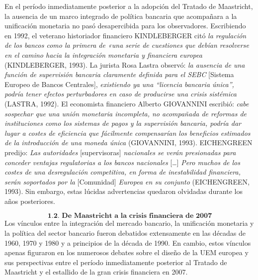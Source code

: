 \documentclass[10pt,a4paper]{article}
\begin{document}
{En el período inmediatamente posterior a la adopción del Tratado de Maastricht, la ausencia de un marco integrado de política bancaria que acompañara a la unificación monetaria no pasó desapercibida para los observadores. Escribiendo en 1992, el veterano historiador financiero KINDLEBERGER citó \textit{la regulación de los bancos como la primera de «una serie de cuestiones que debían resolverse en el camino hacia la integración monetaria y financiera europea} (KINDLEBERGER, 1993). La jurista Rosa Lastra observó: \textit{la ausencia de una función de supervisión bancaria claramente definida para el SEBC} [Sistema Europeo de Bancos Centrales], \textit{existiendo ya una “licencia bancaria única”, podría tener efectos perturbadores en caso de producirse una crisis sistémica} (LASTRA, 1992). El economista financiero Alberto GIOVANNINI escribió: \textit{cabe sospechar que una unión monetaria incompleta, no acompañada de reformas de instituciones como los sistemas de pagos y la supervisión bancaria, podría dar lugar a costes de eficiencia que fácilmente compensarían los beneficios estimados de la introducción de una moneda única} (GIOVANNINI, 1993). EICHENGREEN predijo: \textit{Las autoridades} [supervisoras] \textit{nacionales se verán presionadas para conceder ventajas regulatorias a los bancos nacionales} […] \textit{Pero muchos de los costes de una desregulación competitiva, en forma de inestabilidad financiera, serán soportados por la} [Comunidad] \textit{Europea en su conjunto} (EICHENGREEN, 1993). Sin embargo, estas lúcidas advertencias quedaron olvidadas durante los años posteriores.

$$\textbf{1.2. De Maastricht a la crisis financiera de 2007}$$
Los vínculos entre la integración del mercado bancario, la unificación monetaria y la política del sector bancario fueron debatidos extensamente en las décadas de 1960, 1970 y 1980 y a principios de la década de 1990. En cambio, estos vínculos apenas figuraron en los numerosos debates sobre el diseño de la UEM europea y sus perspectivas entre el período inmediatamente posterior al Tratado de Maastricht y el estallido de la gran crisis financiera en 2007. 

}
\end{document}
